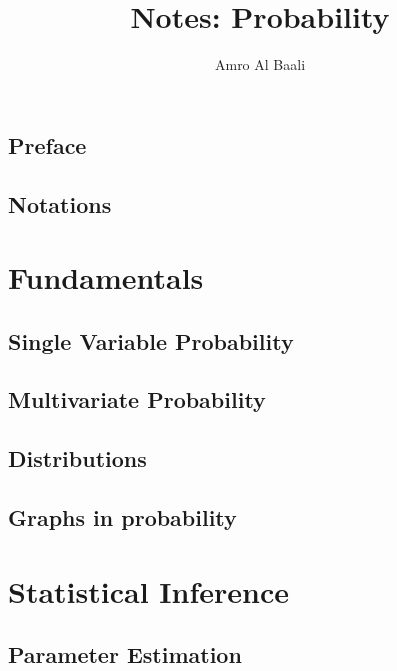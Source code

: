 \documentclass{Templates/amro-notes}
\title{Notes: Probability}
\author{{Amro Al Baali}}
\date{\daterange}
\begin{document}
\maketitle
\tableofcontents
{} 


\chapter*{Preface}


\clearpage
\chapter*{Notations}


\clearpage
{} 
\part{Fundamentals}

\chapter{Single Variable Probability}


\clearpage
\chapter{Multivariate Probability}


\clearpage
\chapter{Distributions}


\clearpage
\chapter{Graphs in probability}


\clearpage
\part{Statistical Inference}

% 

\chapter{Parameter Estimation}



\begin{appendices}
    
\end{appendices}


\end{document}
